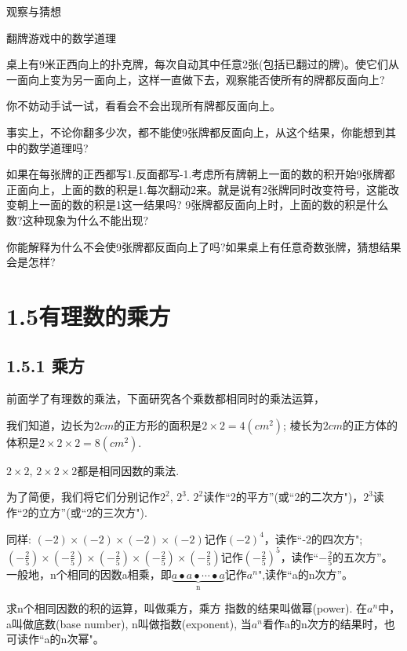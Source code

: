 \documentclass{article}
\begin{document}
观察与猜想

翻牌游戏中的数学道理

桌上有9米正西向上的扑克牌，每次自动其中任意2张(包括已翻过的牌)。使它们从一面向上变为另一面向上，这样一直做下去，观察能否使所有的牌都反面向上?

你不妨动手试一试，看看会不会出现所有牌都反面向上。

事实上，不论你翻多少次，都不能使9张牌都反面向上，从这个结果，你能想到其中的数学道理吗?

如果在每张牌的正西都写1.反面都写-1.考虑所有牌朝上一面的数的积开始9张牌都正面向上，上面的数的积是1.每次翻动2来。就是说有2张牌同时改变符号，这能改变朝上一面的数的积是1这一结果吗? 9张牌都反面向上时，上面的数的积是什么数?这种现象为什么不能出现?

你能解释为什么不会使9张牌都反面向上了吗?如果桌上有任意奇数张牌，猜想结果会是怎样?



\section*{1.5有理数的乘方}
\subsection*{1.5.1 乘方}

前面学了有理数的乘法，下面研究各个乘数都相同时的乘法运算，

我们知道，边长为$2cm$的正方形的面积是$2\times2=4(cm^2)$; 棱长为$2cm$的正方体的体积是$2\times2\times2=8(cm^2)$.

$2\times2$, $2\times2\times2$都是相同因数的乘法.

为了简便，我们将它们分别记作$2^2$, $2^3$. $2^2$读作“2的平方”(或“2的二次方")，$2^3$读作“2的立方”(或“2的三次方").

同样:
$(-2)\times(-2)\times(-2)\times(-2)$记作$(-2)^4$，读作“-2的四次方";$(-\frac{2}{5})\times(-\frac{2}{5})\times(-\frac{2}{5})\times(-\frac{2}{5})\times(-\frac{2}{5})$记作$(-\frac{2}{5})^5$，读作“$-\frac{2}{5}$的五次方”。
一般地，n个相同的因数a相乘，即$\underbrace{a\bullet a\bullet\cdots\bullet a}_{\text{n}} $记作$a^n$",读作“a的n次方”。


\begin{definition}
求n个相同因数的积的运算，叫做乘方，乘方  指数的结果叫做幂(power). 在$a^n$中，a叫做底数(base number), n叫做指数(exponent), 当$a^n$看作a的n次方的结果时，也可读作“a的n次幂"。
\end{definition}
\end{document}

